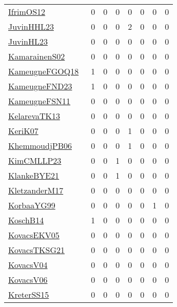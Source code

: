 {\begin{longtable}{l*{7}{r}}
\href{papers/IfrimOS12.pdf}{IfrimOS12}~\cite{IfrimOS12} & 0 & 0 & 0 & 0 & 0 & 0 & 0\\
\href{papers/JuvinHHL23.pdf}{JuvinHHL23}~\cite{JuvinHHL23} & 0 & 0 & 0 & 2 & 0 & 0 & 0\\
\href{papers/JuvinHL23.pdf}{JuvinHL23}~\cite{JuvinHL23} & 0 & 0 & 0 & 0 & 0 & 0 & 0\\
\href{papers/KamarainenS02.pdf}{KamarainenS02}~\cite{KamarainenS02} & 0 & 0 & 0 & 0 & 0 & 0 & 0\\
\href{papers/KameugneFGOQ18.pdf}{KameugneFGOQ18}~\cite{KameugneFGOQ18} & 1 & 0 & 0 & 0 & 0 & 0 & 0\\
\href{papers/KameugneFND23.pdf}{KameugneFND23}~\cite{KameugneFND23} & 1 & 0 & 0 & 0 & 0 & 0 & 0\\
\href{papers/KameugneFSN11.pdf}{KameugneFSN11}~\cite{KameugneFSN11} & 0 & 0 & 0 & 0 & 0 & 0 & 0\\
\href{papers/KelarevaTK13.pdf}{KelarevaTK13}~\cite{KelarevaTK13} & 0 & 0 & 0 & 0 & 0 & 0 & 0\\
\href{papers/KeriK07.pdf}{KeriK07}~\cite{KeriK07} & 0 & 0 & 0 & 1 & 0 & 0 & 0\\
\href{papers/KhemmoudjPB06.pdf}{KhemmoudjPB06}~\cite{KhemmoudjPB06} & 0 & 0 & 0 & 1 & 0 & 0 & 0\\
\href{papers/KimCMLLP23.pdf}{KimCMLLP23}~\cite{KimCMLLP23} & 0 & 0 & 1 & 0 & 0 & 0 & 0\\
\href{papers/KlankeBYE21.pdf}{KlankeBYE21}~\cite{KlankeBYE21} & 0 & 0 & 1 & 0 & 0 & 0 & 0\\
\href{papers/KletzanderM17.pdf}{KletzanderM17}~\cite{KletzanderM17} & 0 & 0 & 0 & 0 & 0 & 0 & 0\\
\href{papers/KorbaaYG99.pdf}{KorbaaYG99}~\cite{KorbaaYG99} & 0 & 0 & 0 & 0 & 0 & 1 & 0\\
\href{papers/KoschB14.pdf}{KoschB14}~\cite{KoschB14} & 1 & 0 & 0 & 0 & 0 & 0 & 0\\
\href{papers/KovacsEKV05.pdf}{KovacsEKV05}~\cite{KovacsEKV05} & 0 & 0 & 0 & 0 & 0 & 0 & 0\\
\href{papers/KovacsTKSG21.pdf}{KovacsTKSG21}~\cite{KovacsTKSG21} & 0 & 0 & 0 & 0 & 0 & 0 & 0\\
\href{papers/KovacsV04.pdf}{KovacsV04}~\cite{KovacsV04} & 0 & 0 & 0 & 0 & 0 & 0 & 0\\
\href{papers/KovacsV06.pdf}{KovacsV06}~\cite{KovacsV06} & 0 & 0 & 0 & 0 & 0 & 0 & 0\\
\href{papers/KreterSS15.pdf}{KreterSS15}~\cite{KreterSS15} & 0 & 0 & 0 & 0 & 0 & 0 & 0\\

\end{longtable}}
